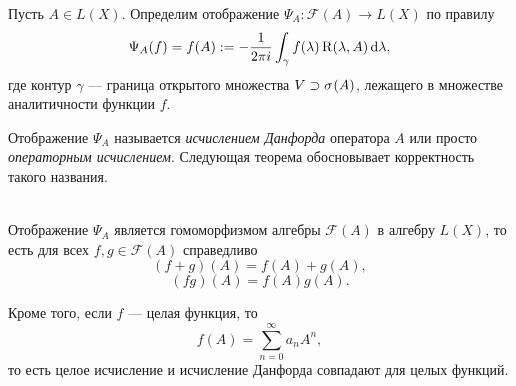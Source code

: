 Пусть $A \in L(X)$. Определим отображение $\Psi_A \colon \mathcal F(A) \to L(X)$ по правилу
\[ \Psi_A(f) = f(A) 
    := -\frac{1}{2\pi i} \int_{\gamma} f(\lambda) \operatorname{R}(\lambda, A) \,\mathrm{d} \lambda, \]
где контур $\gamma$ --- граница открытого множества $V \supset \spectrum{A}$, лежащего в множестве
аналитичности функции $f$.

Отображение $\Psi_A$ называется \emph{исчислением Данфорда} оператора $A$ или просто
\emph{операторным исчислением}. Следующая теорема обосновывает корректность такого названия.

\begin{theorem}\hfill\\
    \indent Отображение $\Psi_A$ является гомоморфизмом алгебры $\mathcal F(A)$ в алгебру $L(X)$, то есть для всех
    $f, g \in \mathcal F(A)$ справедливо
    \[ (f+g)(A) = f(A) + g(A), \]
    \[ (fg)(A) = f(A)g(A). \]

    Кроме того, если $f$ --- целая функция, то
    \[ f(A) = \sum_{n=0}^\infty a_n A^n, \]
    то есть целое исчисление и исчисление Данфорда совпадают для целых функций.
\end{theorem}

